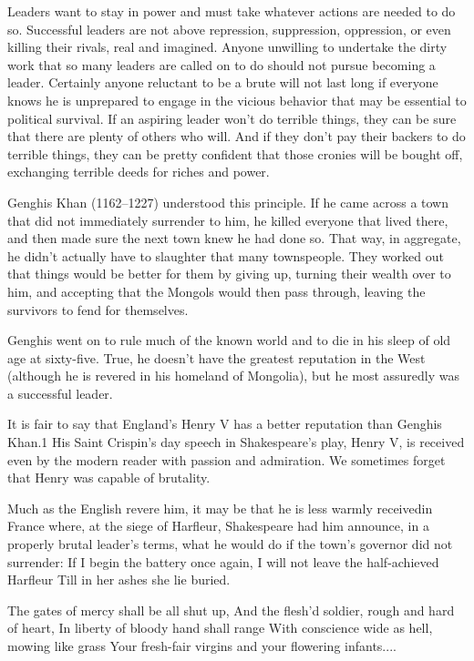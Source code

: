 \documentclass[10pt]{article}
\begin{document}
{\large Leaders want to stay in power and must take whatever actions are needed
to do so. Successful leaders are not above repression, suppression, oppression,
or even killing their rivals, real and imagined. Anyone unwilling to undertake
the dirty work that so many leaders are called on to do should not pursue
becoming a leader. Certainly anyone reluctant to be a brute will not last long if
everyone knows he is unprepared to engage in the vicious behavior that may be
essential to political survival. If an aspiring leader won't do terrible things,
they can be sure that there are plenty of others who will. And if they don't pay
their backers to do terrible things, they can be pretty confident that those
cronies will be bought off, exchanging terrible deeds for riches and power.}

{\large Genghis Khan (1162--1227) understood this principle. If he came across a
town that did not immediately surrender to him, he killed everyone that lived
there, and then made sure the next town knew he had done so. That way, in
aggregate, he didn't actually have to slaughter that many townspeople. They
worked out that things would be better for them by giving up, turning their
wealth over to him, and accepting that the Mongols would then pass through,
leaving the survivors to fend for themselves.}

{\large Genghis went on to rule much of the known world and to die in his sleep
of old age at sixty-five. True, he doesn't have the greatest reputation in the
West (although he is revered in his homeland of Mongolia), but he most assuredly
was a successful leader.}

{\large It is fair to say that England's Henry V has a better reputation than
Genghis Khan.1 His Saint Crispin's day speech in Shakespeare's play, Henry V, is
received even by the modern reader with passion and admiration. We sometimes
forget that Henry was capable of brutality.}

{\large Much as the English revere him, it may be that he is less warmly
receivedin France where, at the siege of Harfleur, Shakespeare had him announce,
in a properly brutal leader's terms, what he would do if the town's governor did
not surrender: If I begin the battery once again, I will not leave the
half-achieved Harfleur Till in her ashes she lie buried.}

{\large The gates of mercy shall be all shut up, And the flesh'd soldier, rough
and hard of heart, In liberty of bloody hand shall range With conscience wide as
hell, mowing like grass Your fresh-fair virgins and your flowering infants....}
\end{document}
